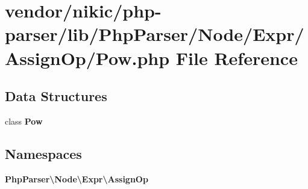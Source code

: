 \section{vendor/nikic/php-\/parser/lib/\+Php\+Parser/\+Node/\+Expr/\+Assign\+Op/\+Pow.php File Reference}
\label{_assign_op_2_pow_8php}
\subsection*{Data Structures}
\begin{DoxyCompactItemize}
\item 
class {\bf Pow}
\end{DoxyCompactItemize}
\subsection*{Namespaces}
\begin{DoxyCompactItemize}
\item 
 {\bf Php\+Parser\textbackslash{}\+Node\textbackslash{}\+Expr\textbackslash{}\+Assign\+Op}
\end{DoxyCompactItemize}
